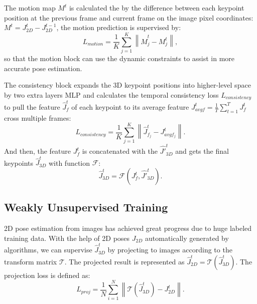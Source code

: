 \documentclass[letterpaper]{article} %
\begin{document}

The motion map ${M}^t$ is calculated the by the difference between each keypoint position at the previous frame and current frame on the image pixel coordinates: $M^t = J_{2D}^{t} - J_{2D}^{t-1}$, the motion prediction is supervised by:
$$L_{motion}=\frac{1}{K}\sum_{j=1}^{K}\left\|\hat{M}_{j}^t-M_{j}^t\right\|,$$
so that the motion block can use the dynamic constraints to assist in more accurate pose estimation.

The consistency block expands the 3D keypoint positions into higher-level space by two extra layers MLP and calculates the temporal consistency loss $L_{consistency}$ to pull the feature $\hat{J}_f^{t}$ of each keypoint to its average feature $J_{avgf}^{t} = \frac{1}{T}\sum_{t = 1}^T J_f^{t}$ cross multiple frames:
$$L_{consistency} = \frac{1}{K}\sum_{j=1}^{K}\left\|\hat{J}^{t}_{f_j}-J^{t}_{avgf_j}\right\|.$$
And then, the feature $J_f^{t}$ is concatenated with the $\hat{J'}_{3D}^t$ and gets the final keypoints $\hat{J}_{3D}^t$ with function $\mathcal{F}$:
$$\hat{J}_{3D}^t = \mathcal{F}(J_f^{t},\hat{J'}_{3D}^t).$$ 



\subsection{Weakly Unsupervised Training}
2D pose estimation from images has achieved great progress due to huge labeled training data. With the help of 2D poses ${J_{2D}}$ automatically generated by algorithms, we can supervise $\hat{J}_{3D}^t$ by projecting to images according to the transform matrix $\mathcal{T}$. The projected result is represented as $\hat{J}_{2D}^{t} = \mathcal{T}(\hat{J}_{3D}^{t})$. The projection loss is defined as:
$$L_{proj} = \frac{1}{N}\sum_{i=1}^{N}\left\|\mathcal{T}(\hat{J}_{3D}^{t})-J_{2D}^{t}\right\|.$$
\end{document}
